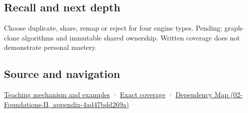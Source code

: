 \subsection{Recall and next depth}\label{recall-and-next-depth}

Choose duplicate, share, remap or reject for four engine types. Pending: graph-clone algorithms and immutable shared ownership. Written coverage does not demonstrate personal mastery.

\subsection{Source and navigation}\label{source-and-navigation}

\href{Continuous\%20Notes/Computing\%20Foundations\%20-\%20From\%20Bits\%20to\%20C++\%20and\%20Systems\%20APIs\#Copy\%20a\%20meaning\%20rather\%20than\%20just\%20its\%20bytes}{Teaching mechanism and examples} · \hyperref[appendix-fd090d982a15]{Exact coverage} · \href{}{Dependency Map (02-Foundations-II, appendix-4ad47bdd269a)}
